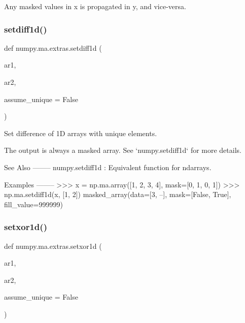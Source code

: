 \begin{DoxyVerb}Any masked values in x is propagated in y, and vice-versa.\end{DoxyVerb}
 \mbox{\label{namespacenumpy_1_1ma_1_1extras_a7f81c7f639f6f7b8c1ce7ad0514f2a29}} 
\subsubsection{\texorpdfstring{setdiff1d()}{setdiff1d()}}
{\footnotesize\ttfamily def numpy.\+ma.\+extras.\+setdiff1d (\begin{DoxyParamCaption}\item[{}]{ar1,  }\item[{}]{ar2,  }\item[{}]{assume\+\_\+unique = {\ttfamily False} }\end{DoxyParamCaption})}

\begin{DoxyVerb}Set difference of 1D arrays with unique elements.

The output is always a masked array. See `numpy.setdiff1d` for more
details.

See Also
--------
numpy.setdiff1d : Equivalent function for ndarrays.

Examples
--------
>>> x = np.ma.array([1, 2, 3, 4], mask=[0, 1, 0, 1])
>>> np.ma.setdiff1d(x, [1, 2])
masked_array(data=[3, --],
             mask=[False,  True],
       fill_value=999999)\end{DoxyVerb}
 \mbox{\label{namespacenumpy_1_1ma_1_1extras_a8975f3af9dda34908dfa233fbca3c0fe}} 
\subsubsection{\texorpdfstring{setxor1d()}{setxor1d()}}
{\footnotesize\ttfamily def numpy.\+ma.\+extras.\+setxor1d (\begin{DoxyParamCaption}\item[{}]{ar1,  }\item[{}]{ar2,  }\item[{}]{assume\+\_\+unique = {\ttfamily False} }\end{DoxyParamCaption})}

